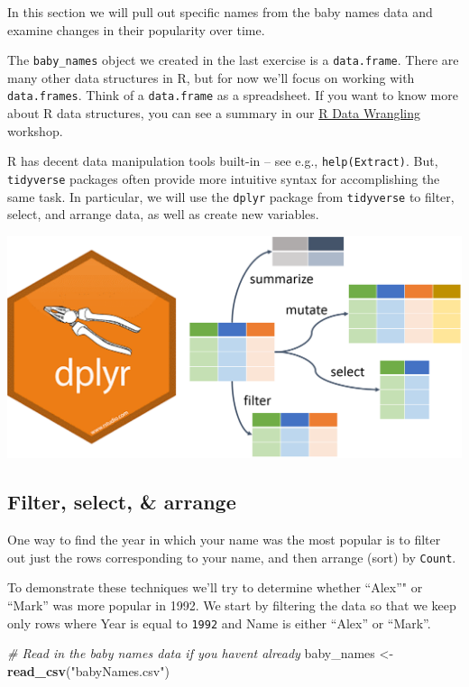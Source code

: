 \documentclass[
]{book}
\newenvironment{Shaded}{\begin{snugshade}}{\end{snugshade}}
\newcommand{\CommentTok}[1]{\textcolor[rgb]{0.56,0.35,0.01}{\textit{#1}}}
\newcommand{\KeywordTok}[1]{\textcolor[rgb]{0.13,0.29,0.53}{\textbf{#1}}}
\newcommand{\NormalTok}[1]{#1}
\newcommand{\StringTok}[1]{\textcolor[rgb]{0.31,0.60,0.02}{#1}}
\begin{document}
In this section we will pull out specific names from the baby names data and examine changes in their popularity over time.

The \texttt{baby\_names} object we created in the last exercise is a \texttt{data.frame}. There are many other data structures in R, but for now we'll focus on working with \texttt{data.frames}. Think of a \texttt{data.frame} as a spreadsheet. If you want to know more about R data structures, you can see a summary in our \href{./RDataWrangling.html\#data-types-and-structures}{R Data Wrangling} workshop.

R has decent data manipulation tools built-in -- see e.g., \texttt{help(Extract)}. But, \texttt{tidyverse} packages often provide more intuitive syntax for accomplishing the same task. In particular, we will use the \texttt{dplyr} package from \texttt{tidyverse} to filter, select, and arrange data, as well as create new variables.

\includegraphics{R/Rintro/images/dplyr.png}

\hypertarget{filter-select-arrange}{%
\subsection{Filter, select, \& arrange}\label{filter-select-arrange}}

One way to find the year in which your name was the most popular is to filter out just the rows corresponding to your name, and then arrange (sort) by \texttt{Count}.

To demonstrate these techniques we'll try to determine whether ``Alex''" or ``Mark'' was more popular in 1992. We start by filtering the data so that we keep only rows where Year is equal to \texttt{1992} and Name is either ``Alex'' or ``Mark''.

\begin{Shaded}
\begin{Highlighting}[]
\CommentTok{\# Read in the baby names data if you haven\textquotesingle{}t already}
\NormalTok{baby\_names \textless{}{-}}\StringTok{ }\KeywordTok{read\_csv}\NormalTok{(}\StringTok{"babyNames.csv"}\NormalTok{)}
\end{Highlighting}
\end{Shaded}
\end{document}
